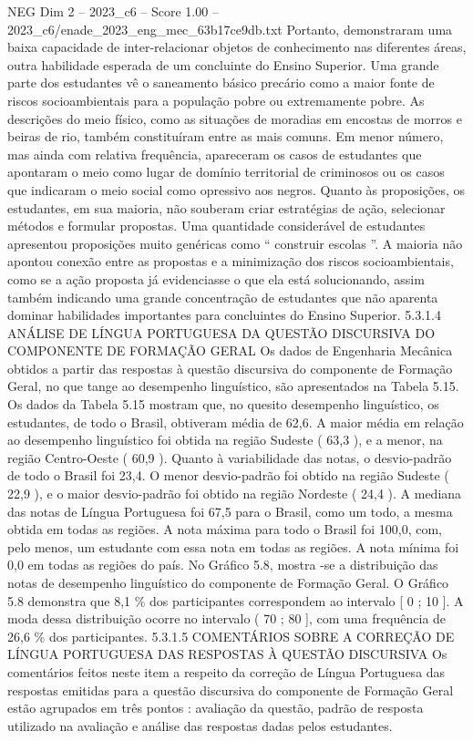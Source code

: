 \begin{textsample}{NEG Dim 2 – 2023\_c6 – Score 1.00 – 2023\_c6/enade\_2023\_eng\_mec\_63b17ce9db.txt}
Portanto, demonstraram uma baixa capacidade de inter-relacionar objetos de conhecimento nas diferentes áreas, outra habilidade esperada de um concluinte do Ensino Superior.
Uma grande parte dos estudantes vê o saneamento básico precário como a maior fonte de riscos socioambientais para a população pobre ou extremamente pobre.
As descrições do meio físico, como as situações de moradias em encostas de morros e beiras de rio, também constituíram entre as mais comuns.
Em menor número, mas ainda com relativa frequência, apareceram os casos de estudantes que apontaram o meio como lugar de domínio territorial de criminosos ou os casos que indicaram o meio social como opressivo aos negros.
Quanto às proposições, os estudantes, em sua maioria, não souberam criar estratégias de ação, selecionar métodos e formular propostas.
Uma quantidade considerável de estudantes apresentou proposições muito genéricas como “ construir escolas ”.
A maioria não apontou conexão entre as propostas e a minimização dos riscos socioambientais, como se a ação proposta já evidenciasse o que ela está solucionando, assim também indicando uma grande concentração de estudantes que não aparenta dominar habilidades importantes para concluintes do Ensino Superior. 5.3.1.4 ANÁLISE DE LÍNGUA PORTUGUESA DA QUESTÃO DISCURSIVA DO COMPONENTE DE FORMAÇÃO GERAL Os dados de Engenharia Mecânica obtidos a partir das respostas à questão discursiva do componente de Formação Geral, no que tange ao desempenho linguístico, são apresentados na Tabela 5.15.
Os dados da Tabela 5.15 mostram que, no quesito desempenho linguístico, os estudantes, de todo o Brasil, obtiveram média de 62,6.
A maior média em relação ao desempenho linguístico foi obtida na região Sudeste ( 63,3 ), e a menor, na região Centro-Oeste ( 60,9 ).
Quanto à variabilidade das notas, o desvio-padrão de todo o Brasil foi 23,4.
O menor desvio-padrão foi obtido na região Sudeste ( 22,9 ), e o maior desvio-padrão foi obtido na região Nordeste ( 24,4 ).
A mediana das notas de Língua Portuguesa foi 67,5 para o Brasil, como um todo, a mesma obtida em todas as regiões.
A nota máxima para todo o Brasil foi 100,0, com, pelo menos, um estudante com essa nota em todas as regiões.
A nota mínima foi 0,0 em todas as regiões do país.
No Gráfico 5.8, mostra -se a distribuição das notas de desempenho linguístico do componente de Formação Geral.
O Gráfico 5.8 demonstra que 8,1 \% dos participantes correspondem ao intervalo [ 0 ; 10 ].
A moda dessa distribuição ocorre no intervalo ( 70 ; 80 ], com uma frequência de 26,6 \% dos participantes. 5.3.1.5 COMENTÁRIOS SOBRE A CORREÇÃO DE LÍNGUA PORTUGUESA DAS RESPOSTAS À QUESTÃO DISCURSIVA Os comentários feitos neste item a respeito da correção de Língua Portuguesa das respostas emitidas para a questão discursiva do componente de Formação Geral estão agrupados em três pontos : avaliação da questão, padrão de resposta utilizado na avaliação e análise das respostas dadas pelos estudantes.

\end{textsample}
